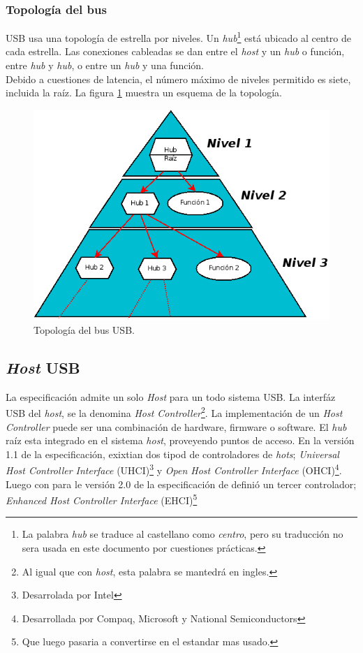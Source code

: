 \subsubsection{Topolog\'ia del bus}

USB usa una topolog\'ia de estrella por niveles. Un \emph{hub}\footnote{La
palabra \emph{hub} se traduce al castellano como \emph{centro}, pero su
traducci\'on no sera usada en este documento por cuestiones pr\'acticas.}
est\'a ubicado al centro de cada estrella. Las conexiones cableadas se dan
entre el \emph{host} y un \emph{hub} o funci\'on, entre \emph{hub} y
\emph{hub}, o entre un \emph{hub} y una funci\'on. \\

Debido a cuestiones de latencia, el n\'umero m\'aximo de niveles permitido es
siete, incluida la ra\'iz. La figura \ref{fig:usb_topology} muestra un esquema
de la topolog\'ia.

\begin{figure}
\centering
\includegraphics[scale=0.5]{./img/usb_topology.png}
\caption{Topolog\'ia del bus USB.}
\label{fig:usb_topology}
\end{figure}


\subsection{\emph{Host} USB}

La especificaci\'on admite un solo \emph{Host} para un todo sistema USB. La
interf\'az USB del \emph{host}, se la denomina \emph{Host
Controller}\footnote{Al igual que con \emph{host}, esta palabra se mantedr\'a
en ingles.}. La implementaci\'on de un \emph{Host Controller} puede ser una
combinaci\'on de hardware, firmware o software. El \emph{hub} ra\'iz esta
integrado en el sistema \emph{host}, proveyendo puntos de acceso.
En la versi\'on 1.1 de la especificaci\'on, exixtian dos tipod de
controladores de \emph{hots}; \emph{Universal Host Controller Interface}
(UHCI)\footnote{Desarrolada por Intel} y \emph{Open Host Controller Interface}
(OHCI)\footnote{Desarrollada por Compaq, Microsoft y National Semiconductors}.
Luego con para le versi\'on 2.0 de la especificaci\'on de defini\'o un tercer
controlador; \emph{Enhanced Host Controller Interface} (EHCI)\footnote{Que
luego pasaria a convertirse en el estandar mas usado.}


